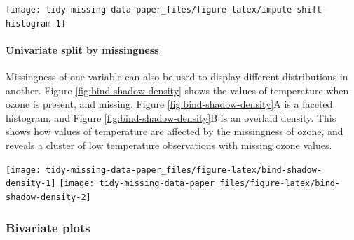 \documentclass[]{article}
\let\oldparagraph\paragraph
\renewcommand{\paragraph}[1]{\oldparagraph{#1}\mbox{}}
\let\origfigure\figure
\let\endorigfigure\endfigure
\renewenvironment{figure}[1][2] {
    \expandafter\origfigure\expandafter[H]
} {
    \endorigfigure
}
\theoremstyle{definition}
\theoremstyle{definition}
\theoremstyle{definition}
\theoremstyle{remark}
\begin{document}
\begin{figure}

{\centering \texttt{[image: tidy-missing-data-paper\_files/figure-latex/impute-shift-histogram-1]} 

}

\caption{A histogram using nabular data to show the values and missings in ozone. Values are imputed below the range to show the number of missings in Ozone and colored according to missingness of ozone (`Ozone\_NA`). There are about 35 missings in Ozone.}\label{fig:impute-shift-histogram}
\end{figure}

\hypertarget{vis-split-by-miss}{%
\paragraph{Univariate split by missingness}\label{vis-split-by-miss}}

Missingness of one variable can also be used to display different
distributions in another. Figure \ref{fig:bind-shadow-density} shows the
values of temperature when ozone is present, and missing. Figure
\ref{fig:bind-shadow-density}A is a faceted histogram, and Figure
\ref{fig:bind-shadow-density}B is an overlaid density. This shows how
values of temperature are affected by the missingness of ozone, and
reveals a cluster of low temperature observations with missing ozone
values.

\begin{figure}

{\centering \texttt{[image: tidy-missing-data-paper\_files/figure-latex/bind-shadow-density-1]} \texttt{[image: tidy-missing-data-paper\_files/figure-latex/bind-shadow-density-2]} 

}

\caption{A visualization of temperature according to missingness in ozone from in the airquality dataset. A histogram of temperature facetted by the missingness of ozone (A), or a density of temperature colored by missingness in ozone (B). The distribution shows a cluster of low temperature observations with missing ozone values, but the temperature values are otherwise similar.}\label{fig:bind-shadow-density}
\end{figure}

\hypertarget{bivariate-plots}{%
\subsubsection{Bivariate plots}\label{bivariate-plots}}
\end{document}
